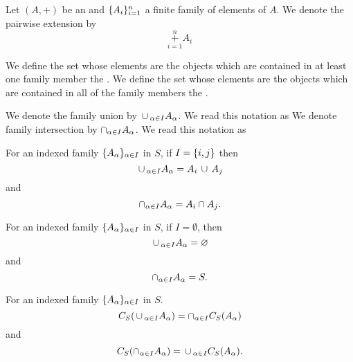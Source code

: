 
Let $(A, +)$ be an  and
$\{A_{i}\}_{i=1}^{n}$ a finite family
of elements of $A$. We denote the pairwise
extension by
\[
  \overset{n}{\underset{i=1}{+}} A_i
\]


We define the set whose elements are the objects
which are contained in at least one family member
the .
We define the set whose elements are the objects
which are contained in all of the family members
the .


We denote the family union by $\,\cup\,_{\alpha \in I} A_{\alpha}$.
We read this notation as 
We denote family intersection by $\cap_{\alpha \in I} A_{\alpha}$.
We read this notation as 


\begin{prop}
  For an indexed family $\{A_{\alpha}\}_{\alpha \in I}$ in $S$, if $I = \{i, j\}$ then
  \[
    \,\cup\,_{\alpha \in I} A_{\alpha} = A_i \,\cup\, A_j
  \]
  and
  \[
    \cap_{\alpha \in I} A_{\alpha} = A_i \cap A_j.
  \]
\end{prop}

\begin{prop}
  For an indexed family $\{A_{\alpha}\}_{\alpha \in I}$ in $S$, if $I = \emptyset$, then
  \[
    \,\cup\,_{\alpha \in I} A_{\alpha} = \varnothing
  \]
  and
  \[
    \cap_{\alpha \in I} A_{\alpha} = S.
  \]
\end{prop}

\begin{prop}
  For an indexed family $\{A_{\alpha}\}_{\alpha \in I}$ in $S$.
  \[
    C_S(\,\cup\,_{\alpha \in I} A_{\alpha}) = \cap_{\alpha \in I} C_S(A_{\alpha})
  \]
  and
  \[
    C_S(\cap_{\alpha \in I} A_{\alpha}) = \,\cup\,_{\alpha \in I} C_S(A_{\alpha}).
  \]
\end{prop}

\strats
